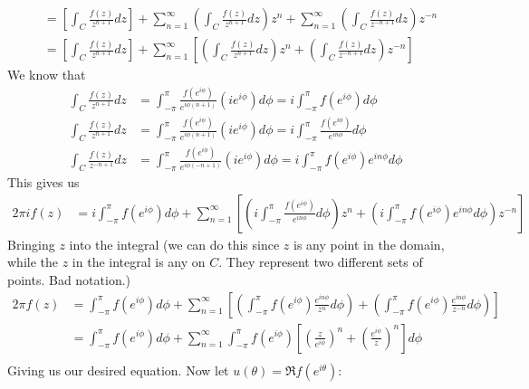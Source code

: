 \documentclass[12pt, english]{book}
\makeatletter
\renewenvironment{proof}[1][\proofname]{\par
	\pushQED{\qed}%
	\normalfont \topsep6\p@\@plus6\p@\relax
	\list{}{%
		\settowidth{\leftmargin}{\itshape\proofname:\hskip\labelsep}%
		\setlength{\labelwidth}{0pt}%
		\setlength{\itemindent}{-\leftmargin}%
	}%
	\item[\hskip\labelsep\itshape#1\@addpunct{:}]\ignorespaces
	}{ \popQED\endlist\@endpefalse}
\makeatother
\begin{document}
\begin{example}
\begin{proof}
{\begin{align*}
				&= \left[\int_{C} \frac{f(z)}{z^{n+1}} dz \right]
				 + \sum_{n=1}^{\infty} \left(\int_{C} \frac{f(z)}{z^{n+1}} dz \right) z^n
				 + \sum_{n=1}^{\infty} \left(\int_{C} \frac{f(z)}{z^{-n+1}} dz \right) z^{-n} \\
				&= \left[\int_{C} \frac{f(z)}{z^{n+1}} dz \right]
				+ \sum_{n=1}^{\infty} \left[ \left(\int_{C} \frac{f(z)}{z^{n+1}} dz \right) z^n
				+ \left(\int_{C} \frac{f(z)}{z^{-n+1}} dz \right) z^{-n} \right] 
			\end{align*}
			We know that 
			\begin{align*}
				\int_{C} \frac{f(z)}{z^{n+1}} dz 
				&= \int_{-\pi}^{\pi} \frac{f(e^{i\phi})}{e^{i\phi(n+1)}} (ie^{i\phi}) d\phi
				 = i \int_{-\pi}^{\pi} f(e^{i\phi}) d\phi \\
				\int_{C} \frac{f(z)}{z^{n+1}} dz
				&= \int_{-\pi}^{\pi}  \frac{f(e^{i\phi})}{e^{i\phi(n+1)}} (ie^{i\phi}) d\phi
				 = i \int_{-\pi}^{\pi} \frac{f(e^{i\phi})}{e^{in\phi}}  d\phi \\
				\int_{C} \frac{f(z)}{z^{-n+1}} dz
				&= \int_{-\pi}^{\pi}  \frac{f(e^{i\phi})}{e^{i\phi(-n+1)}} (ie^{i\phi}) d\phi
				 = i \int_{-\pi}^{\pi}  f(e^{i\phi}) e^{in\phi} d\phi
			\end{align*}
			This gives us
			\begin{align*}
				2\pi i f(z)
				&=  i \int_{-\pi}^{\pi} f(e^{i\phi}) d\phi + \sum_{n=1}^{\infty} \left[
				\left(  i \int_{-\pi}^{\pi} \frac{f(e^{i\phi})}{e^{in\phi}} d\phi \right) z^n 
				+ \left( i \int_{-\pi}^{\pi}  f(e^{i\phi}) e^{in\phi} d\phi \right) z^{-n}
				\right]
			\end{align*}
			Bringing \(z\) into the integral (we can do this since \(z\) is any point in the domain, while the \(z\) in the integral is any on \(C\). They represent two different sets of points. Bad notation.)
			\begin{align*}
				2\pi f(z)
				&= \int_{-\pi}^{\pi} f(e^{i\phi}) d\phi + \sum_{n=1}^{\infty} \left[
				\left( \int_{-\pi}^{\pi} f(e^{i\phi}) \frac{e^{in\phi}}{z^n} d\phi \right) 
				+ \left( \int_{-\pi}^{\pi}  f(e^{i\phi}) \frac{e^{in\phi}}{z^{-n}} d\phi \right) \right] \\
				&= \int_{-\pi}^{\pi} f(e^{i\phi}) d\phi + \sum_{n=1}^{\infty} 
				\int_{-\pi}^{\pi} f(e^{i\phi}) 
				\left[ \left( \frac{z}{e^{i\phi}} \right)^n 
				+  \left(\frac{e^{i\phi}}{z} \right)^n  \right] d\phi \\
			\end{align*}
			Giving us our desired equation. Now let \(u(\theta) = \Re{f(e^{i\theta})}\):
}
\end{proof}
\end{example}
\end{document}
